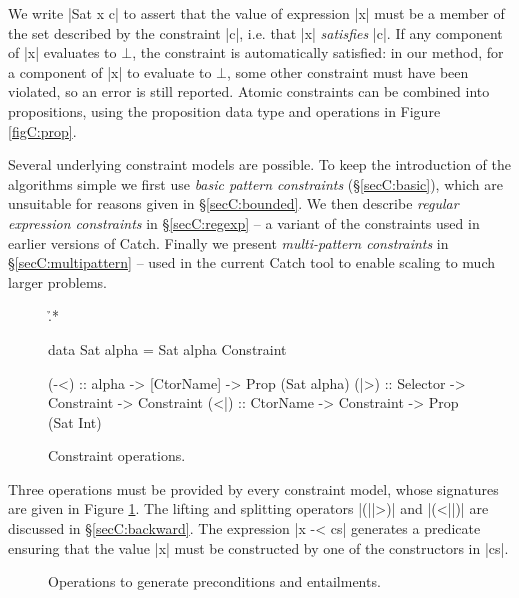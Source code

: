 We write |Sat x c| to assert that the value of expression |x| must be a member of the set described by the constraint |c|, i.e. that |x| \textit{satisfies} |c|. If any component of |x| evaluates to $\bot{}$, the constraint is automatically satisfied: in our method, for a component of |x| to evaluate to $\bot{}$, some other constraint must have been violated, so an error is still reported. Atomic constraints can be combined into propositions, using the proposition data type and operations in Figure \ref{figC:prop}.

Several underlying constraint models are possible. To keep the introduction of the algorithms simple we first use \textit{basic pattern constraints} (\S\ref{secC:basic}), which are unsuitable for reasons given in \S\ref{secC:bounded}. We then describe \textit{regular expression constraints} in \S\ref{secC:regexp} -- a variant of the constraints used in earlier versions of Catch. Finally we present \textit{multi-pattern constraints} in \S\ref{secC:multipattern} -- used in the current Catch tool to enable scaling to much larger problems.

\begin{figure}
\h{.*}\begin{code}
data Sat alpha = Sat alpha Constraint

(-<)  :: alpha -> [CtorName] -> Prop (Sat alpha)
(|>)  :: Selector -> Constraint -> Constraint
(<|)  :: CtorName -> Constraint -> Prop (Sat Int)
\end{code}
\caption{Constraint operations.}
\label{figC:constraint}
\end{figure}

Three operations must be provided by every constraint model, whose signatures are given in Figure \ref{figC:constraint}. The lifting and splitting operators |(||>)| and |(<||)| are discussed in \S\ref{secC:backward}. The expression |x -< cs| generates a predicate ensuring that the value |x| must be constructed by one of the constructors in |cs|.

\begin{figure}
\caption{Operations to generate preconditions and entailments.}
\label{figC:operations}
\end{figure}


